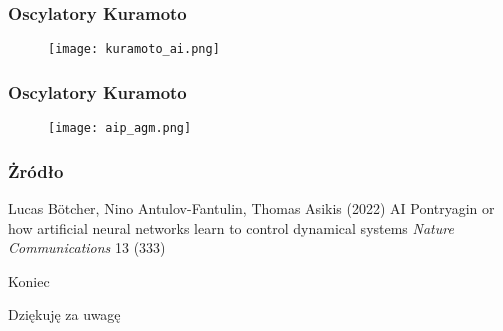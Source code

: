 \documentclass{presentation_fg}
\begin{document}
{
\begin{frame}
	\frametitle{Oscylatory Kuramoto}
	\begin{figure}
		\texttt{[image: kuramoto\_ai.png]}
	\end{figure}
\end{frame}

\begin{frame}
	\frametitle{Oscylatory Kuramoto}
	\begin{figure}
		\texttt{[image: aip\_agm.png]}
	\end{figure}
\end{frame}
}


\begin{frame} %
	\frametitle{Żródło}
	
	\begin{thebibliography}{99} %
		\footnotesize %
		
			Lucas B\"otcher, Nino Antulov-Fantulin, Thomas Asikis (2022)
			\newblock AI Pontryagin or how artificial neural networks learn to control
			dynamical systems
			\newblock \emph{Nature Communications} 13 (333)
	\end{thebibliography}
\end{frame}

\begin{frame}[plain] %
	\begin{center}
		{\Huge Koniec}
		
		\bigskip\bigskip %
		
		{\LARGE Dziękuję za uwagę}
	\end{center}
\end{frame}

\end{document}
